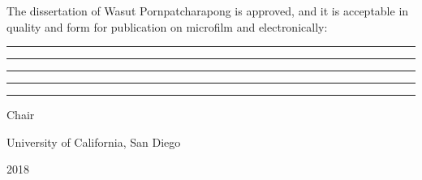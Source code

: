\newpage
\thispagestyle{plain}


\doublespacing

\vspace*{\fill}

\noindent The dissertation of Wasut Pornpatcharapong is approved, and it is acceptable in quality and form
for publication on microfilm and electronically:

\vspace{0.35cm}

\par\noindent\rule{\textwidth}{0.5pt}

\vspace{0.35cm}

\par\noindent\rule{\textwidth}{0.5pt}

\vspace{0.35cm}

\par\noindent\rule{\textwidth}{0.5pt}

\vspace{0.35cm}

\par\noindent\rule{\textwidth}{0.5pt}

\vspace{0.35cm}

\par\noindent\rule{\textwidth}{0.5pt}

\begin{flushright}
    {Chair}
\end{flushright}

\begin{center}
    University of California, San Diego
 
    2018
\end{center}

\vspace*{\fill}
